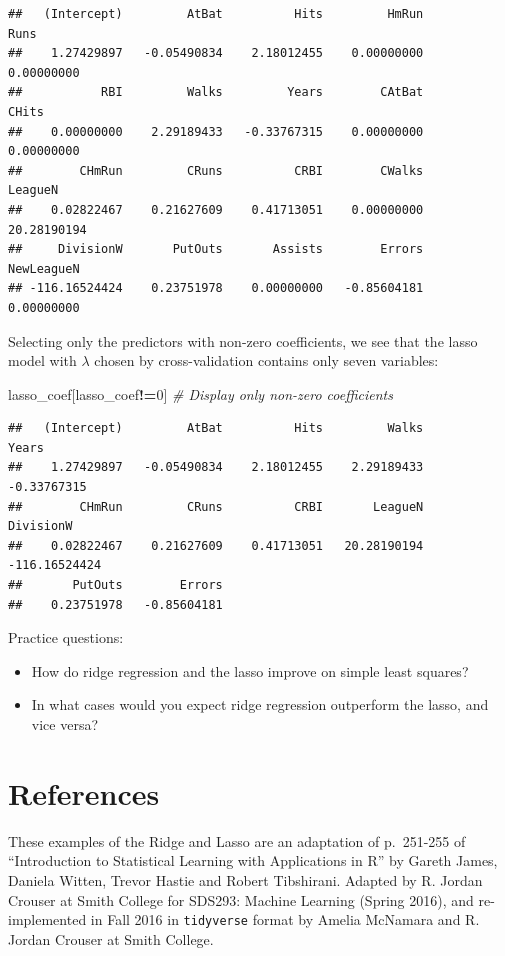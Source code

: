 \documentclass[openany]{book}
\newenvironment{Shaded}{\begin{snugshade}}{\end{snugshade}}
\newcommand{\CommentTok}[1]{\textcolor[rgb]{0.56,0.35,0.01}{\textit{#1}}}
\newcommand{\DecValTok}[1]{\textcolor[rgb]{0.00,0.00,0.81}{#1}}
\newcommand{\NormalTok}[1]{#1}
\newcommand{\OperatorTok}[1]{\textcolor[rgb]{0.81,0.36,0.00}{\textbf{#1}}}
\providecommand{\tightlist}{%
  \setlength{\itemsep}{0pt}\setlength{\parskip}{0pt}}
\begin{document}
\begin{verbatim}
##   (Intercept)         AtBat          Hits         HmRun          Runs 
##    1.27429897   -0.05490834    2.18012455    0.00000000    0.00000000 
##           RBI         Walks         Years        CAtBat         CHits 
##    0.00000000    2.29189433   -0.33767315    0.00000000    0.00000000 
##        CHmRun         CRuns          CRBI        CWalks       LeagueN 
##    0.02822467    0.21627609    0.41713051    0.00000000   20.28190194 
##     DivisionW       PutOuts       Assists        Errors    NewLeagueN 
## -116.16524424    0.23751978    0.00000000   -0.85604181    0.00000000
\end{verbatim}

Selecting only the predictors with non-zero coefficients, we see that the lasso model with \(\lambda\)
chosen by cross-validation contains only seven variables:

\begin{Shaded}
\begin{Highlighting}[]
\NormalTok{lasso_coef[lasso_coef}\OperatorTok{!=}\DecValTok{0}\NormalTok{] }\CommentTok{# Display only non-zero coefficients}
\end{Highlighting}
\end{Shaded}

\begin{verbatim}
##   (Intercept)         AtBat          Hits         Walks         Years 
##    1.27429897   -0.05490834    2.18012455    2.29189433   -0.33767315 
##        CHmRun         CRuns          CRBI       LeagueN     DivisionW 
##    0.02822467    0.21627609    0.41713051   20.28190194 -116.16524424 
##       PutOuts        Errors 
##    0.23751978   -0.85604181
\end{verbatim}

Practice questions:

\begin{itemize}
\tightlist
\item
  How do ridge regression and the lasso improve on simple least squares?
\item
  In what cases would you expect ridge regression outperform the lasso, and vice versa?
\end{itemize}

\hypertarget{references}{%
\section{References}\label{references}}

These examples of the Ridge and Lasso are an adaptation of p.~251-255 of ``Introduction to
Statistical Learning with Applications in R'' by Gareth James, Daniela Witten, Trevor Hastie and Robert
Tibshirani. Adapted by R. Jordan Crouser at Smith College for SDS293: Machine Learning (Spring 2016), and re-implemented in Fall 2016 in \texttt{tidyverse} format by Amelia McNamara and R. Jordan Crouser at Smith College.
\end{document}
